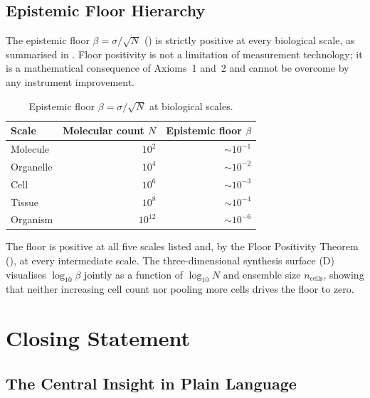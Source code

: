 \subsection{Epistemic Floor Hierarchy}

The epistemic floor $\beta = \sigma/\sqrt{N}$ ()
is strictly positive at every biological scale, as summarised in
.  Floor positivity is not a limitation of
measurement technology; it is a mathematical consequence of Axioms~1 and~2
and cannot be overcome by any instrument improvement.

\begin{table}[!htbp]
\centering
\caption{Epistemic floor $\beta = \sigma/\sqrt{N}$ at biological scales.}
\label{tab:floor-hierarchy}
\begin{tabular}{@{}lrr@{}}
\toprule
Scale & Molecular count $N$ & Epistemic floor $\beta$ \\
\midrule
Molecule  & $10^2$   & $\sim 10^{-1}$  \\
Organelle & $10^4$   & $\sim 10^{-2}$  \\
Cell      & $10^6$   & $\sim 10^{-3}$  \\
Tissue    & $10^8$   & $\sim 10^{-4}$  \\
Organism  & $10^{12}$& $\sim 10^{-6}$  \\
\bottomrule
\end{tabular}
\end{table}

The floor is positive at all five scales listed and, by the Floor Positivity
Theorem (), at every intermediate scale.  The
three-dimensional synthesis surface (D) visualises
$\log_{10}\beta$ jointly as a function of $\log_{10} N$ and ensemble size
$n_{\mathrm{cells}}$, showing that neither increasing cell count nor pooling
more cells drives the floor to zero.

\section{Closing Statement}
\label{sec:closing}

\subsection{The Central Insight in Plain Language}

